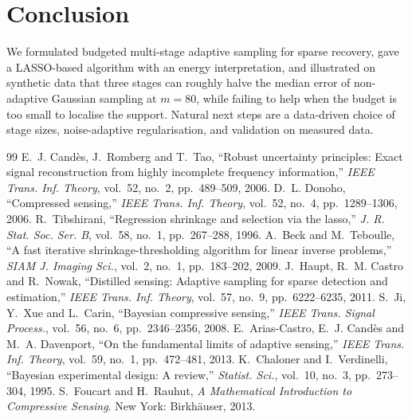 \documentclass[11pt,a4paper]{article}
\theoremstyle{definition}
\begin{document}
\section{Conclusion}\label{sec:conclusion}
We formulated budgeted multi-stage adaptive sampling for sparse recovery, gave a LASSO-based algorithm with an energy interpretation, and illustrated on synthetic data that three stages can roughly halve the median error of non-adaptive Gaussian sampling at $m=80$, while failing to help when the budget is too small to localise the support. Natural next steps are a data-driven choice of stage sizes, noise-adaptive regularisation, and validation on measured data.

\begin{thebibliography}{99}\small
{} E.~J. Cand\`es, J.~Romberg and T.~Tao, ``Robust uncertainty principles: Exact signal reconstruction from highly incomplete frequency information,'' \emph{IEEE Trans. Inf. Theory}, vol.~52, no.~2, pp.~489--509, 2006.
 D.~L. Donoho, ``Compressed sensing,'' \emph{IEEE Trans. Inf. Theory}, vol.~52, no.~4, pp.~1289--1306, 2006.
 R.~Tibshirani, ``Regression shrinkage and selection via the lasso,'' \emph{J. R. Stat. Soc. Ser. B}, vol.~58, no.~1, pp.~267--288, 1996.
 A.~Beck and M.~Teboulle, ``A fast iterative shrinkage-thresholding algorithm for linear inverse problems,'' \emph{SIAM J. Imaging Sci.}, vol.~2, no.~1, pp.~183--202, 2009.
 J.~Haupt, R.~M. Castro and R.~Nowak, ``Distilled sensing: Adaptive sampling for sparse detection and estimation,'' \emph{IEEE Trans. Inf. Theory}, vol.~57, no.~9, pp.~6222--6235, 2011.
 S.~Ji, Y.~Xue and L.~Carin, ``Bayesian compressive sensing,'' \emph{IEEE Trans. Signal Process.}, vol.~56, no.~6, pp.~2346--2356, 2008.
 E.~Arias-Castro, E.~J. Cand\`es and M.~A. Davenport, ``On the fundamental limits of adaptive sensing,'' \emph{IEEE Trans. Inf. Theory}, vol.~59, no.~1, pp.~472--481, 2013.
 K.~Chaloner and I.~Verdinelli, ``Bayesian experimental design: A review,'' \emph{Statist. Sci.}, vol.~10, no.~3, pp.~273--304, 1995.
 S.~Foucart and H.~Rauhut, \emph{A Mathematical Introduction to Compressive Sensing}. New York: Birkh\"auser, 2013.
\end{thebibliography}
\end{document}
